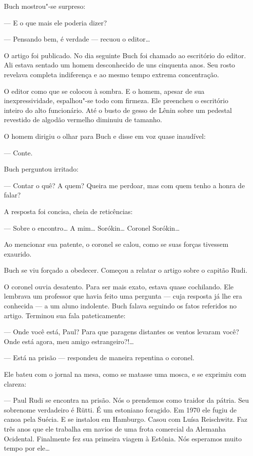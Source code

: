 Buch mostrou"-se surpreso:

--- E o que mais ele poderia dizer?

--- Pensando bem, é verdade --- recuou o editor\ldots{}

O artigo foi publicado. No dia seguinte Buch foi chamado ao escritório
do editor. Ali estava sentado um homem desconhecido de uns cinquenta
anos. Seu rosto revelava completa indiferença e ao mesmo tempo extrema
concentração.

O editor como que se colocou à sombra. E o homem, apesar de sua
inexpressividade, espalhou"-se todo com firmeza. Ele preencheu o
escritório inteiro do alto funcionário. Até o busto de gesso de Lênin
sobre um pedestal revestido de algodão vermelho diminuiu de tamanho.

O homem dirigiu o olhar para Buch e disse em voz quase inaudível:

--- Conte.

Buch perguntou irritado:

--- Contar o quê? A quem? Queira me perdoar, mas com quem tenho a honra
de falar?

A resposta foi concisa, cheia de reticências:

--- Sobre o encontro\ldots{} A mim\ldots{} Sorókin\ldots{} Coronel Sorókin\ldots{}

Ao mencionar sua patente, o coronel se calou, como se suas forças
tivessem exaurido.

Buch se viu forçado a obedecer. Começou a relatar o artigo sobre o
capitão Rudi.

O coronel ouvia desatento. Para ser mais exato, estava quase cochilando.
Ele lembrava um professor que havia feito uma pergunta --- cuja resposta
já lhe era conhecida --- a um aluno indolente. Buch falava seguindo os
fatos referidos no artigo. Terminou sua fala pateticamente:

--- Onde você está, Paul? Para que paragens distantes os ventos levaram
você? Onde está agora, meu amigo estrangeiro?!\ldots{}

--- Está na prisão --- respondeu de maneira repentina o coronel.

Ele bateu com o jornal na mesa, como se matasse uma mosca, e se exprimiu
com clareza:

--- Paul Rudi se encontra na prisão. Nós o prendemos como traidor da
pátria. Seu sobrenome verdadeiro é Rütti. É um estoniano foragido. Em
1970 ele fugiu de canoa pela Suécia. E se instalou em Hamburgo. Casou
com Luísa Reischwitz. Faz três anos que ele trabalha em navios de uma
frota comercial da Alemanha Ocidental. Finalmente fez sua primeira
viagem à Estônia. Nós esperamos muito tempo por ele\ldots{}

